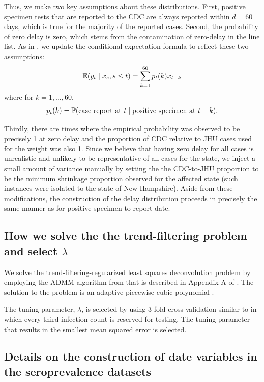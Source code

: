 \documentclass{article}
\begin{document}
Thus, we make two key assumptions about these distributions. First, positive
specimen tests that are reported to the CDC are always reported within $d = 60$
days, which is true for the majority of the reported cases. Second, the
probability of zero delay is zero, which stems from the contamination of
zero-delay in the line list. As in \citet{jahja2022real}, we update the
conditional expectation formula to reflect these two assumptions: 
\begin{align*}
\E(y_t \mid x_s, s \leq t) = \sum_{k=1}^{60} p_t(k) x_{t-k}
\end{align*}
where for $k = 1, \dots, 60$,
\begin{align*}
p_t(k) = \P(\text{case report at }t \mid \text{positive specimen at }t-k).
\end{align*}


Thirdly, there are times where the empirical probability
was observed to be precisely 1 at zero delay and the proportion of CDC relative
to JHU cases used for the weight was also 1. Since we believe that having zero
delay for all cases is unrealistic and unlikely to be representative of all
cases for the state, we inject a small amount of variance manually by setting
the the CDC-to-JHU proportion to be the minimum shrinkage proportion observed
for the affected state (such instances were isolated to the state of New
Hampshire). Aside from these modifications, the construction of the delay
distribution proceeds in precisely the same manner as for positive specimen to
report date. 


\subsection{How we solve the the trend-filtering problem and select $\lambda$}
\label{supp:trend-lambda}
We solve the trend-filtering-regularized least squares deconvolution problem by
employing the ADMM algorithm from \citet{ramdas2016fast} that is described in
Appendix A of \citet{jahja2022real}. The solution to the problem is an adaptive
piecewise cubic polynomial \citep{tibshirani2014adaptive,
tibshirani2022divided}.

The tuning parameter, $\lambda$, is selected by using $3$-fold cross validation
similar to \citet{jahja2022real} in which every third infection count is
reserved for testing. The tuning parameter that results in the smallest mean
squared error is selected.


\subsection{Details on the construction of date variables in the seroprevalence datasets}
\label{supp:sero-date-details}
\end{document}
